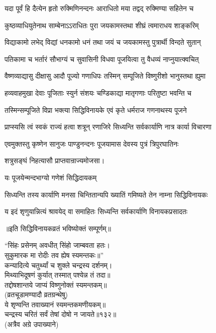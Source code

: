 \twolineshloka
{यदा पूर्वं हि दैत्येन हृतो रुक्मिणिनन्दनः}
{आराधितो मया तद्वद् रुक्मिण्या सहितेन च}%

\twolineshloka
{कुष्ठव्याधियुतेनाथ साम्बेनाऽऽराधितः पुरा}
{जयकामस्तथा शीघ्रं त्वमाराधय शाङ्करिम्}%

\twolineshloka
{विद्याकामो लभेद् विद्यां धनकामो धनं तथा}
{जयं च जयकामस्तु पुत्रार्थी विन्दते सुतान्}%

\twolineshloka
{पतिकामा च भर्तारं सौभाग्यं च सुवासिनी}
{विधवा पूजयित्वा तु वैधव्यं नाप्नुयात्क्वचित्}%

\twolineshloka
{वैष्णव्याद्यासु दीक्षासु आदौ पूज्यो गणाधिपः}
{तस्मिन् सम्पूजिते विष्णुरीशो भानुस्तथा ह्युमा}%

\twolineshloka
{हव्यवाहमुखा देवाः पूजिताः स्युर्न संशयः}
{चण्डिकाद्या मातृगणाः परितुष्टा भवन्ति च}%

\twolineshloka
{तस्मिन्सम्पूजिते विप्रा भक्त्या सिद्धिविनायके}
{एवं कृते धर्मराज गणनाथस्य पूजने}%

\twolineshloka
{प्राप्स्यसि त्वं स्वकं राज्यं हत्वा शत्रून् रणाजिरे}
{सिध्यन्ति सर्वकार्याणि नात्र कार्या विचारणा}%

\twolineshloka
{एवमुक्तस्तु कृष्णेन सानुजः पाण्डुनन्दनः}
{पूजयामास देवस्य पुत्रं त्रिपुरघातिनः}%

शत्रुसङ्घं निहत्यासौ प्राप्तवान्राज्यमोजसा।

\onelineshloka
{यः पूजयेन्मन्दभाग्यो गणेशं सिद्धिदायकम्}%

\twolineshloka
{सिध्यन्ति तस्य कार्याणि मनसा चिन्तितान्यपि}
{ख्यातिं गमिष्यते तेन नाम्ना सिद्धिविनायकः}%

\twolineshloka
{य इदं शृणुयान्नित्यं श्रावयेद् वा समाहितः}
{सिध्यन्ति सर्वकार्याणि विनायकप्रसादतः}%

॥इति सिद्धिविनायकव्रतं भविष्योक्तं सम्पूर्णम्॥

“सिंहः प्रसेनम् अवधीत् सिंहो जाम्बवता हतः।\\
सुकुमारक मा रोदीः तव ह्येष स्यमन्तकः॥”\\

कन्यादित्ये चतुर्थ्यां च शुक्ले चन्द्रस्य दर्शनम्।\\
मिथ्याभिदूषणं कुर्यात् तस्मात् पश्येन्न तं तदा॥\\
तद्दोषशान्तये जाप्यं विष्णुनोक्तं स्यमन्तकम्॥\\
(व्रतचूडामण्यादौ व्रतग्रन्थेषु)\\

ये शृण्वन्ति तवाख्यानं स्यमन्तकमणीयकम्॥ \\
चन्द्रस्य चरितं सर्वं तेषां दोषो न जायते॥१३२॥\\
(अत्रैव अग्रे उपाख्याने)\\